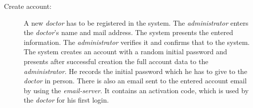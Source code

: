 \documentclass[fontsize=12pt,
               paper=a4,
               twoside=false,
               parskip=half,
               ]{scrartcl}
\begin{document}
\begin{description}	
\item[Create account:] A new \emph{doctor} has to be registered in the system. The \emph{administrator} enters the \emph{doctor}'s name and mail address. The system presents the entered information. The \emph{administrator} verifies it and confirms that to the system. The system creates an account with a random initial password and presents after successful creation the full account data to the \emph{administrator}. He records the initial password which he has to give to the \emph{doctor} in person. There is also an email sent to the entered account email by using the \emph{email-server}. It contains an activation code, which is used by the \emph{doctor} for his first login.






\end{description}
\end{document}
